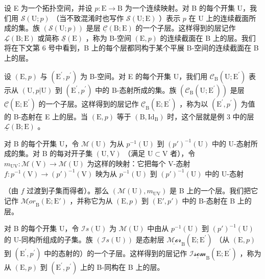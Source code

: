 
设 E 为一个拓扑空间，并设 \(p \colon \mathrm{E} \to \mathrm{B}\) 为一个连续映射。对 B 的每个开集 U，我们用 \(\mathcal{S}(\mathrm{U};p)\) （当不致混淆时也写作 \(\mathcal{S}(\mathrm{U};\mathrm{E})\) ）表示 \(p\) 在 U 上的连续截面所成的集。族 \((\mathcal{S}(\mathrm{U};p))\) 是层 \(\underline{\mathcal{C}}(\mathrm{B};\mathrm{E})\) 的一个子层。这样得到的层记作 \(\underline{\mathcal{L}}(\mathrm{B};\mathrm{E})\) 或简称 \(\underline{\mathcal{S}}(\mathrm{E})\) ，称为 B-空间 \((\mathrm{E},p)\) 的连续截面在 B 上的层。我们将在下文第 6 号中看到，B 上的每个层都同构于某个平展 B-空间的连续截面在 B 上的层。


设 \((\mathrm{E},p)\) 与 \((\mathrm{E}^{\prime},p^{\prime})\) 为 B-空间。对 E 的每个开集 U，我们用 \(\mathcal{C}_{\mathrm{B}}(\mathrm{U};\mathrm{E}^{\prime})\) 表示从 \((\mathrm{U},p|\mathrm{U})\) 到 \((\mathrm{E}^{\prime},p^{\prime})\) 中的 B-态射所成的集。族 \((\mathcal{C}_{\mathrm{B}}(\mathrm{U};\mathrm{E}^{\prime}))\) 是层 \(\underline{\mathcal{C}}(\mathrm{E};\mathrm{E}^{\prime})\) 的一个子层。这样得到的层记作 \(\underline{\mathcal{C}}_{\mathrm{B}}(\mathrm{E};\mathrm{E}^{\prime})\) ，称为以 \((\mathrm{E}^{\prime},p^{\prime})\) 为值的 B-态射在 E 上的层。当 \((\mathrm{E},p)\) 等于 \((\mathrm{B},\mathrm{Id}_{\mathrm{B}})\) 时，这个层就是例 3 中的层 \(\underline{\mathcal{L}}(\mathrm{B};\mathrm{E})\) 。

对 B 的每个开集 U，令 \(\mathcal{M}(\mathrm{U})\) 为从 \(p^{-1}(\mathrm{U})\) 到 \((p')^{-1}(\mathrm{U})\) 中的 U-态射所成的集。对 B 的每对开子集 \((\mathrm{U},\mathrm{V})\) （满足 \(\mathrm{U}\subset \mathrm{V}\) 者），令 \(m_{\mathrm{UV}}\colon \mathcal{M}(\mathrm{V})\to \mathcal{M}(\mathrm{U})\) 为这样的映射：它把每个 V-态射 \(f\colon p^{-1}(\mathrm{V})\to (p')^{-1}(\mathrm{V})\) 映为从 \(p^{-1}(\mathrm{U})\) 到 \((p')^{-1}(\mathrm{U})\) 中的 U-态射

（由 \(f\) 过渡到子集而得者）。那么 \((\mathcal{M}(\mathrm{U}), m_{\mathrm{UV}})\) 是 B 上的一个层。我们把它记作 \(\underline{\mathcal{M}or}_{\mathrm{B}}(\mathrm{E}; \mathrm{E}')\) ，并称它为从 \((\mathrm{E}, p)\) 到 \((\mathrm{E}', p')\) 中的 B-态射在 B 上的层。

对 B 的每个开集 U，令 \(\mathcal{I}s(\mathrm{U})\) 为 \(\mathcal{M}(\mathrm{U})\) 中由从 \(p^{-1}(\mathrm{U})\) 到 \((p')^{-1}(\mathrm{U})\) 的 U-同构所组成的子集。族 \((\mathcal{I}s(\mathrm{U}))\) 是态射层 \(\underline{\mathcal{Mor}}_{\mathrm{B}}(\mathrm{E};\mathrm{E}^{\prime})\) （从 \((\mathrm{E},p)\) 到 \((\mathrm{E}^{\prime},p^{\prime})\) 中的态射的）的一个子层。这样得到的层记作 \(\underline{\mathcal{Isom}}_{\mathrm{B}}(\mathrm{E};\mathrm{E}^{\prime})\) ，称为从 \((\mathrm{E},p)\) 到 \((\mathrm{E}^{\prime},p^{\prime})\) 上的 B-同构在 B 上的层。

